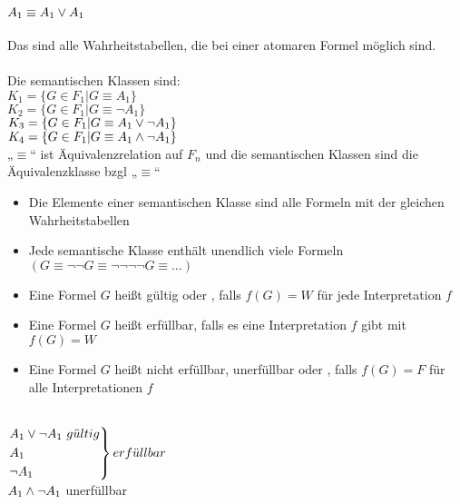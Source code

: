 \noindent\\
$A_1 \equiv A_1 \vee A_1$\\
\noindent\\
Das sind alle Wahrheitstabellen, die bei einer atomaren Formel möglich sind.\\
\noindent\\
Die semantischen Klassen sind:\\
$K_1 = \{G \in F_1 | G \equiv A_1\}$\\
$K_2 = \{G \in F_1 | G \equiv \neg A_1\}$\\
$K_3 = \{G \in F_1 | G \equiv A_1 \vee \neg A_1\}$\\
$K_4 = \{G \in F_1 | G \equiv A_1 \wedge \neg A_1\}$\\
    
\bemerkung{}
„$\equiv$“ ist Äquivalenzrelation auf $F_n$ und die semantischen Klassen sind die Äquivalenzklasse bzgl „$\equiv$“\\

\begin{minipage}{\textwidth}
\bemerkung{}
\begin{itemize}
\item Die Elemente einer semantischen Klasse sind alle Formeln mit der gleichen Wahrheitstabellen
\item Jede semantische Klasse enthält unendlich viele Formeln\\
    $(G \equiv \neg \neg G \equiv \neg \neg \neg \neg G \equiv … )$
\end{itemize}
\end{minipage}

\begin{itemize}
\item Eine Formel $G$ heißt gültig oder , falls $f(G) = W$ für jede Interpretation $f$
\item Eine Formel $G$ heißt erfüllbar, falls es eine Interpretation $f$ gibt mit $f(G) = W$
\item Eine Formel $G$ heißt nicht erfüllbar, unerfüllbar oder , falls $f(G) = F$ für alle Interpretationen $f$
\end{itemize}

\beispiel{}\\
$\begin{rcases} A_1 \OR \neg A_1\ g\ddot{u}ltig \\ A_1 \\ \neg A_1 \end{rcases} erf\ddot{u}llbar$\\
$A_1 \wedge \neg A_1$ unerfüllbar\\

